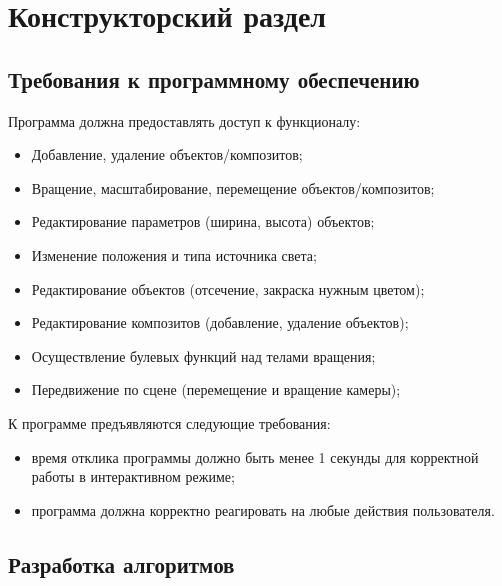 \chapter{Конструкторский раздел}
\section{Требования к программному обеспечению}
Программа должна предоставлять доступ к функционалу:
\begin{itemize}
    \item Добавление, удаление объектов/композитов;
    \item Вращение, масштабирование, перемещение объектов/композитов;
    \item Редактирование параметров (ширина, высота) объектов;
    \item Изменение положения и типа источника света;
    \item Редактирование объектов (отсечение, закраска нужным цветом);
    \item Редактирование композитов (добавление, удаление объектов);
    \item Осуществление булевых функций над телами вращения;
    \item Передвижение по сцене (перемещение и вращение камеры);
\end{itemize}

К программе предъявляются следующие требования:

\begin{itemize}
    \item время отклика программы должно быть менее 1 секунды для корректной работы в интерактивном режиме;
    \item программа должна корректно реагировать на любые действия пользователя.
\end{itemize}

\section{Разработка алгоритмов}

